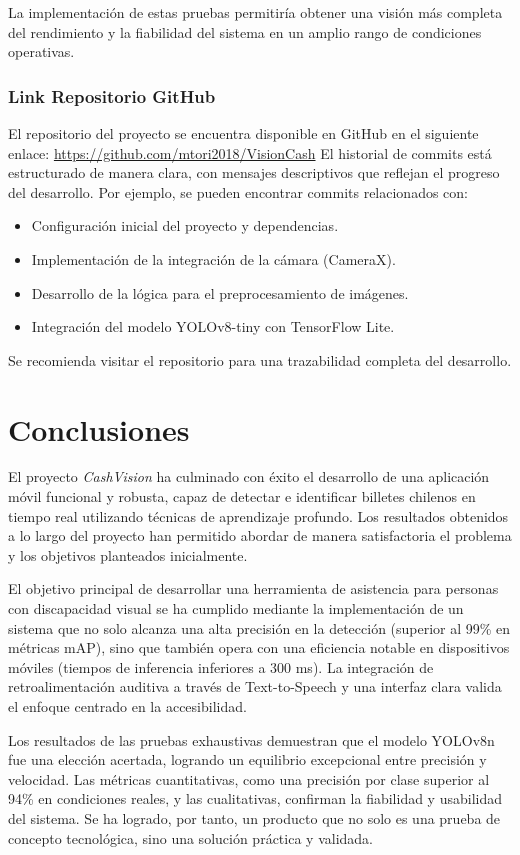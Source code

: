 \documentclass[10pt,a4paper]{report}
\begin{document}
La implementación de estas pruebas permitiría obtener una visión más completa del rendimiento y la fiabilidad del sistema en un amplio rango de condiciones operativas.



\subsection{Link Repositorio GitHub}
El repositorio del proyecto se encuentra disponible en GitHub en el siguiente enlace: \url{https://github.com/mtori2018/VisionCash}
El historial de commits está estructurado de manera clara, con mensajes descriptivos que reflejan el progreso del desarrollo. Por ejemplo, se pueden encontrar commits relacionados con:
\begin{itemize}
    \item Configuración inicial del proyecto y dependencias.
    \item Implementación de la integración de la cámara (CameraX).
    \item Desarrollo de la lógica para el preprocesamiento de imágenes.
    \item Integración del modelo YOLOv8-tiny con TensorFlow Lite.
\end{itemize}
Se recomienda visitar el repositorio para una trazabilidad completa del desarrollo.


\newpage
\chapter{Conclusiones}
El proyecto \textit{CashVision} ha culminado con éxito el desarrollo de una aplicación móvil funcional y robusta, capaz de detectar e identificar billetes chilenos en tiempo real utilizando técnicas de aprendizaje profundo. Los resultados obtenidos a lo largo del proyecto han permitido abordar de manera satisfactoria el problema y los objetivos planteados inicialmente.

El objetivo principal de desarrollar una herramienta de asistencia para personas con discapacidad visual se ha cumplido mediante la implementación de un sistema que no solo alcanza una alta precisión en la detección (superior al 99\% en métricas mAP), sino que también opera con una eficiencia notable en dispositivos móviles (tiempos de inferencia inferiores a 300 ms). La integración de retroalimentación auditiva a través de Text-to-Speech y una interfaz clara valida el enfoque centrado en la accesibilidad.

Los resultados de las pruebas exhaustivas demuestran que el modelo YOLOv8n fue una elección acertada, logrando un equilibrio excepcional entre precisión y velocidad. Las métricas cuantitativas, como una precisión por clase superior al 94\% en condiciones reales, y las cualitativas, confirman la fiabilidad y usabilidad del sistema. Se ha logrado, por tanto, un producto que no solo es una prueba de concepto tecnológica, sino una solución práctica y validada.
\end{document}
